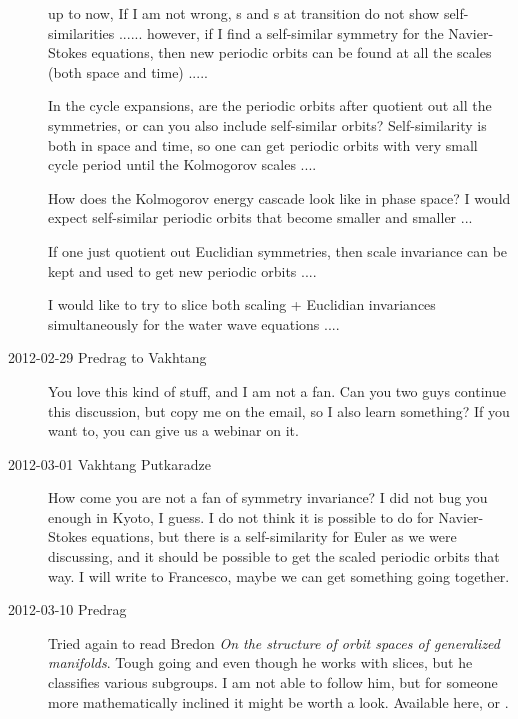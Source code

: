 \begin{description}
up to now, If I am not wrong, \rpo s and \po s at transition
do not show self-similarities ...... however, if I find a
self-similar symmetry for the Navier-Stokes equations, then new
periodic orbits can be found at all the scales (both space and time)
.....

In the cycle expansions, are the periodic orbits after quotient out
all the symmetries, or can you also include self-similar orbits?
Self-similarity is both in space and time, so one can get periodic
orbits with very small cycle period until the Kolmogorov scales ....

How does the Kolmogorov energy cascade look like in phase space?  I
would expect self-similar periodic orbits that become smaller and
smaller ...

If one just quotient out Euclidian symmetries, then scale invariance
can be kept and used to get new periodic orbits ....

I would like to try to slice both scaling + Euclidian invariances
simultaneously for the water wave equations ....

\item[2012-02-29 Predrag to Vakhtang] You love this kind of stuff, and I
am not a fan. Can you two guys continue this discussion, but copy me on
the email, so I also learn something? If you want to, you can give us a
webinar on it.

\item[2012-03-01 Vakhtang Putkaradze] How come you are not a fan of
symmetry invariance? I did not bug you enough in Kyoto, I guess. I do not
think it is possible to do for Navier-Stokes equations, but there is a
self-similarity for Euler as we were discussing, and it should be
possible to get the scaled periodic orbits that way. I will write to
Francesco, maybe we can get something going together.

\item[2012-03-10 Predrag] Tried again to read Bredon
\emph{On the structure of orbit spaces of generalized manifolds}. Tough
going and even though he works with slices, but he classifies various
subgroups. I am not able to follow him, but for someone more
mathematically inclined it might be worth a look. Available
{here}, or
.


\end{description}
